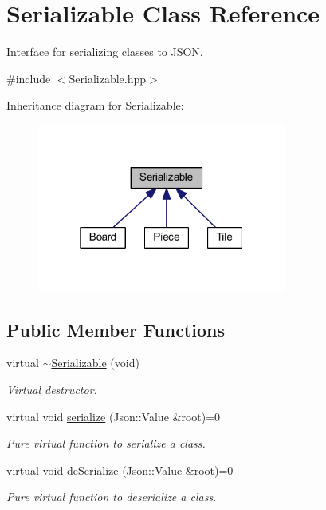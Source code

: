\hypertarget{class_serializable}{\section{Serializable Class Reference}
\label{class_serializable}
}


Interface for serializing classes to J\-S\-O\-N.  




{\ttfamily \#include $<$Serializable.\-hpp$>$}



Inheritance diagram for Serializable\-:
\nopagebreak
\begin{figure}[H]
\begin{center}
\leavevmode
\includegraphics[width=232pt]{class_serializable__inherit__graph}
\end{center}
\end{figure}
\subsection*{Public Member Functions}
\begin{DoxyCompactItemize}
\item 
\hypertarget{class_serializable_a3d7322ec8a0db1573bcabe1590723e31}{virtual \hyperlink{class_serializable_a3d7322ec8a0db1573bcabe1590723e31}{$\sim$\-Serializable} (void)}\label{class_serializable_a3d7322ec8a0db1573bcabe1590723e31}

\begin{DoxyCompactList}\small\item\em Virtual destructor. \end{DoxyCompactList}\item 
virtual void \hyperlink{class_serializable_aa18caa72dd5e441647f86cc7aab62096}{serialize} (Json\-::\-Value \&root)=0
\begin{DoxyCompactList}\small\item\em Pure virtual function to serialize a class. \end{DoxyCompactList}\item 
virtual void \hyperlink{class_serializable_ab423aaa267b7a0c7ad829128acde757c}{de\-Serialize} (Json\-::\-Value \&root)=0
\begin{DoxyCompactList}\small\item\em Pure virtual function to deserialize a class. \end{DoxyCompactList}\end{DoxyCompactItemize}


